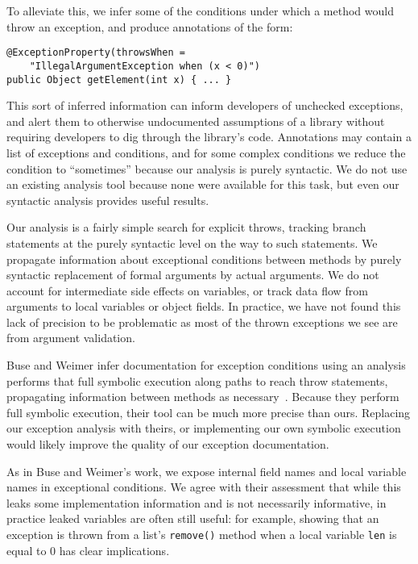 To alleviate this, we infer some of the conditions under which a method would
throw an exception, and produce annotations of the form:

\begin{verbatim}
@ExceptionProperty(throwsWhen =
    "IllegalArgumentException when (x < 0)")
public Object getElement(int x) { ... }
\end{verbatim}

This sort of inferred information can inform developers of unchecked exceptions,
and alert them to otherwise undocumented assumptions of a library without
requiring developers to dig through the library's code.
Annotations may contain a list of exceptions and conditions, and for some
complex conditions we reduce the condition to ``sometimes'' because our analysis
is purely syntactic.  We do not use an
existing analysis tool because none were available for this task, but even our
syntactic analysis provides useful results.

Our analysis is a fairly simple search for explicit throws, tracking branch
statements at the purely syntactic level on the
way to such statements.  We propagate information about exceptional conditions
between methods by purely syntactic replacement of formal arguments by actual
arguments.  We do not account for intermediate side effects on variables, or
track data flow from arguments to local variables or object fields.  In
practice, we have not found this lack of precision to be problematic as most of
the thrown exceptions we see are from argument validation.

Buse and Weimer infer documentation for exception conditions
using an analysis performs that full symbolic execution along paths to reach throw
statements, propagating information between methods as necessary~\cite{autodoc}.
Because they
perform full symbolic execution, their tool can be much more precise than ours.
Replacing our exception analysis with theirs, or implementing our own symbolic
execution would likely improve the quality of our exception documentation.  

As in Buse and Weimer's work, we expose internal field names and
local variable names in exceptional conditions.  We agree with their assessment
that while this leaks some
implementation information and is not necessarily informative, in practice
leaked variables are often still useful: for example, showing that an exception is
thrown from a list's \texttt{remove()} method when a local variable \texttt{len}
is equal to 0 has clear implications.

